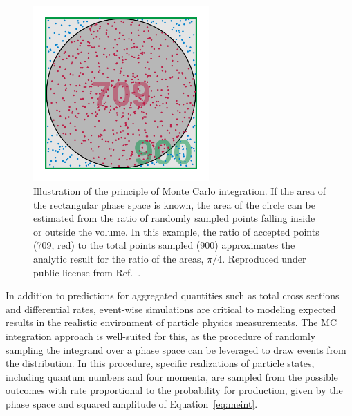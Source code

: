 \begin{figure}[htbp]
  \centering
   \includegraphics[width=0.6\textwidth]{figures/Simulation/MCintegration.png}
  \caption[Illustration of the principle of Monte Carlo integration]{
    Illustration of the principle of Monte Carlo integration. If the area
    of the rectangular phase space is known, the area of the circle can
    be estimated from the ratio of randomly sampled points falling
    inside or outside the volume. In this example, the ratio of accepted
    points (709, red) to the total points sampled (900) approximates the
    analytic result for the ratio of the areas, $\pi/4$.
    Reproduced under public license from Ref.~\cite{wiki:mc}.
        }
 \label{fig:mcintegration}
\end{figure}

In addition to predictions for aggregated quantities such as total cross sections
and differential rates, event-wise simulations are critical to modeling expected 
results in the realistic environment of particle physics measurements.
The MC integration approach is well-suited for this, as the procedure of randomly
sampling the integrand over a phase space can be leveraged to draw events from
the distribution. In this procedure, specific realizations of particle states,
including quantum numbers and four momenta, are sampled from
the possible outcomes with rate proportional to the probability for production,
given by the phase space and squared amplitude of Equation~\ref{eq:meint}.

